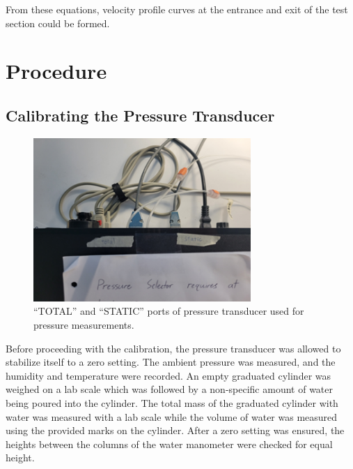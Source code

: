\documentclass[journal,letterpaper]{IEEEtran}
\begin{document}
From these equations, velocity profile curves at the entrance and exit of the test section could be formed.

\section{Procedure}

\subsection{Calibrating the Pressure Transducer}

\begin{figure}[H]
    \centering
    \includegraphics[width=3.25in]{transducerPort}
    \caption{``TOTAL'' and ``STATIC'' ports of pressure transducer used for pressure measurements.}
    \label{fig:transducerPort}
\end{figure}

Before proceeding with the calibration, the pressure transducer was allowed to stabilize itself to a zero setting.
The ambient pressure was measured, and the humidity and temperature were recorded.
An empty graduated cylinder was weighed on a lab scale which was followed by a non-specific amount of water being poured into the cylinder.
The total mass of the graduated cylinder with water was measured with a lab scale while the volume of water was measured using the provided marks on the cylinder.
After a zero setting was ensured, the heights between the columns of the water manometer were checked for equal height.
\end{document}
